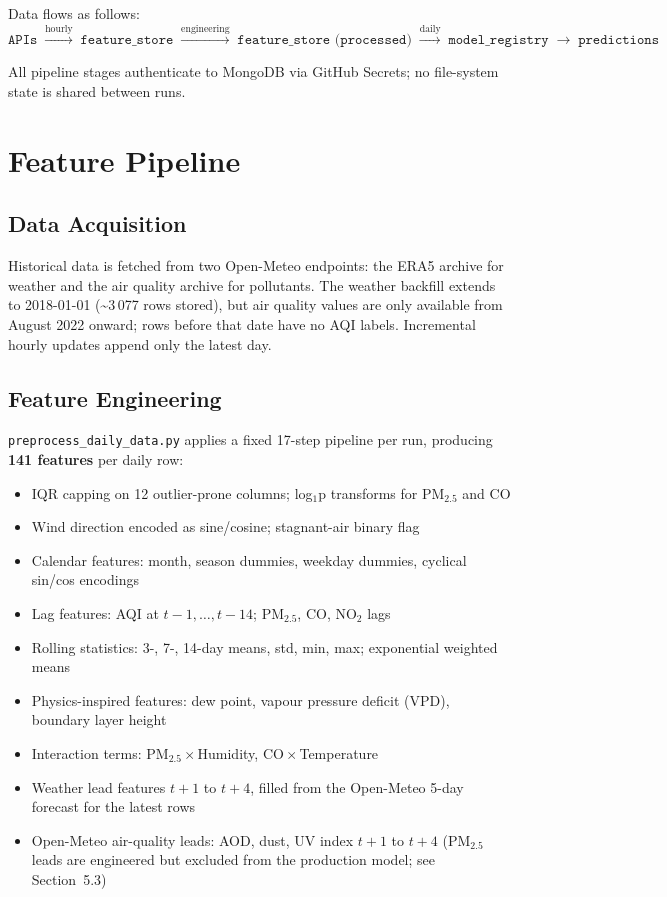 \documentclass[11pt,a4paper]{article}
\begin{document}
\noindent Data flows as follows:
\[
\texttt{APIs} \;\xrightarrow{\text{hourly}}\; \texttt{feature\_store} \;\xrightarrow{\text{engineering}}\;
\texttt{feature\_store (processed)} \;\xrightarrow{\text{daily}}\; \texttt{model\_registry}
\;\xrightarrow{}\; \texttt{predictions}
\]

All pipeline stages authenticate to MongoDB via GitHub Secrets; no file-system
state is shared between runs.

\section{Feature Pipeline}

\subsection{Data Acquisition}
Historical data is fetched from two Open-Meteo endpoints: the ERA5 archive for
weather and the air quality archive for pollutants. The weather backfill extends
to 2018-01-01 (\textasciitilde3\,077 rows stored), but air quality values are
only available from August 2022 onward; rows before that date have no AQI labels.
Incremental hourly updates append only the latest day.

\subsection{Feature Engineering}
\texttt{preprocess\_daily\_data.py} applies a fixed 17-step pipeline per run,
producing \textbf{141 features} per daily row:

\begin{itemize}[noitemsep,topsep=0pt]
  \item IQR capping on 12 outlier-prone columns; log$_1$p transforms for PM$_{2.5}$ and CO
  \item Wind direction encoded as sine/cosine; stagnant-air binary flag
  \item Calendar features: month, season dummies, weekday dummies, cyclical sin/cos encodings
  \item Lag features: AQI at $t{-}1,\ldots,t{-}14$; PM$_{2.5}$, CO, NO$_2$ lags
  \item Rolling statistics: 3-, 7-, 14-day means, std, min, max; exponential weighted means
  \item Physics-inspired features: dew point, vapour pressure deficit (VPD), boundary layer height
  \item Interaction terms: PM$_{2.5}\!\times\!$Humidity, CO$\!\times\!$Temperature
  \item Weather lead features $t{+}1$ to $t{+}4$, filled from the Open-Meteo 5-day forecast for the latest rows
  \item Open-Meteo air-quality leads: AOD, dust, UV index $t{+}1$ to $t{+}4$
        (PM$_{2.5}$ leads are engineered but excluded from the production model; see Section~5.3)
\end{itemize}
\end{document}
